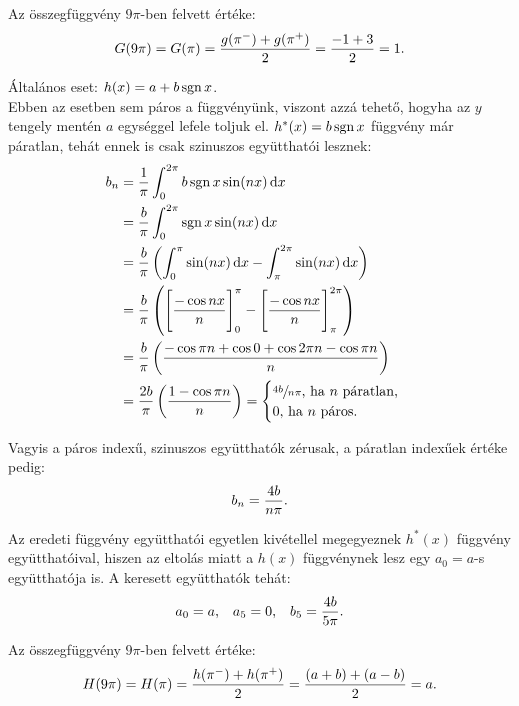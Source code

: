 \begin{exercise}
{    Az összegfüggvény $9\pi$-ben felvett értéke:
    \[
      G(9 \pi) = G(\pi) = \frac{g(\pi^-) + g(\pi^+)}{2} = \frac{-1+3}{2} = 1
      \text.
    \]

    \tcbline

    Általános eset: $h(x) = a + b \operatorname{sgn} x$. \\[3mm]
    Ebben az esetben sem páros a függvényünk, viszont azzá tehető, hogyha
    az $y$ tengely mentén $a$ egységgel lefele toljuk el. $h^*(x) = b \operatorname{sgn} x$
    függvény már páratlan, tehát ennek is csak szinuszos együtthatói lesznek:
    \begin{align*}
      b_n
       & = \frac{1}{\pi} \int_0^{2\pi} b \sgn x \sin(n x) \, \mathrm d x
      \\
       & = \frac{b}{\pi} \int_0^{2\pi} \sgn x \sin(n x) \, \mathrm d x
      \\
       & = \frac{b}{\pi} \left(
      \int_0^{\pi} \sin(n x) \, \mathrm d x -
      \int_\pi^{2\pi} \sin(n x) \, \mathrm d x
      \right)
      \\
       & = \frac{b}{\pi} \left(
      \Bigg[ \frac{-\cos n x}{n} \Bigg]_{0}^{\pi} -
      \Bigg[ \frac{-\cos n x}{n} \Bigg]_{\pi}^{2\pi}
      \right)
      \\
       & = \frac{b}{\pi} \left(
      \frac{%
        - \cos \pi n
        + \cos 0
        + \cos 2 \pi n
        - \cos \pi n
      }{n}
      \right)
      \\
       & = \frac{2b}{\pi} \left(
      \frac{1 - \cos \pi n}{n}
      \right)
      = \begin{cases}
          \sfrac{4b}{n \pi} \text{, ha } n \text{ páratlan,} \\
          0 \text{, ha } n \text{ páros.}
        \end{cases}
    \end{align*}

    Vagyis a páros indexű, szinuszos együtthatók zérusak, a páratlan indexűek
    értéke pedig:
    \[
      b_n = \frac{4b}{n\pi}
      \text.
    \]

    Az eredeti függvény együtthatói egyetlen kivétellel megegyeznek $h^*(x)$
    függvény együtthatóival, hiszen az eltolás miatt a $h(x)$ függvénynek
    lesz egy $a_0 = a$-s együtthatója is. A keresett együtthatók tehát:
    \[
      a_0 = a
      \text,
      \quad
      a_5 = 0
      \text,
      \quad
      b_5 = \frac{4b}{5 \pi}
      \text.
    \]

    Az összegfüggvény $9\pi$-ben felvett értéke:
    \[
      H(9 \pi) = H(\pi) = \frac{h(\pi^-) + h(\pi^+)}{2} = \frac{(a+b)+(a-b)}{2} = a
      \text.
    \]
  }
\end{exercise}
